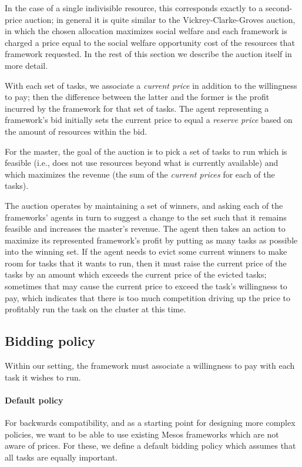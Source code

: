 \documentclass{acm_proc_article-sp}
\begin{document}
In the case of a single indivisible resource, this corresponds exactly
to a second-price auction; in general it is quite similar
to the Vickrey-Clarke-Groves auction, in which the chosen allocation
maximizes social welfare and each framework is charged a price
equal to the social welfare opportunity cost of the resources
that framework requested. In the rest of this section we describe the auction
itself in more detail.

With each set of tasks, we associate a \emph{current price} in addition to the
willingness to pay; then the difference between the latter and the former is the
profit incurred by the framework for that set of tasks. The agent representing a
framework's bid initially sets the current price to equal a \emph{reserve price}
based on the amount of resources within the bid.

For the master, the goal of the auction is to pick a set of tasks to run which
is feasible (i.e., does not use resources beyond what is currently available) and
which maximizes the revenue (the sum of the \emph{current prices} for each of the
tasks).

The auction operates by maintaining a set of winners, and asking each of
the frameworks' agents in turn to suggest a change to the set such that it
remains feasible and increases the master's revenue. The agent then takes an
action to maximize its represented framework's profit by putting as many tasks
as possible into the winning set. If the agent needs to evict some current
winners to make room for tasks that it wants to run, then it must raise the
current price of the tasks by an amount which exceeds the current price of the
evicted tasks; sometimes that may cause the current price to exceed the task's
willingness to pay, which indicates that there is too much competition driving
up the price to profitably run the task on the cluster at this time.

\subsection{Bidding policy}
Within our setting, the framework must associate a willingness to pay with each
task it wishes to run. 

\paragraph{Default policy} For backwards compatibility, 
and as a starting point for designing more complex policies, we want to be able to
use existing Mesos frameworks which are not aware of prices. For these, we
define a default bidding policy which assumes that all tasks are equally
important.
\end{document}

